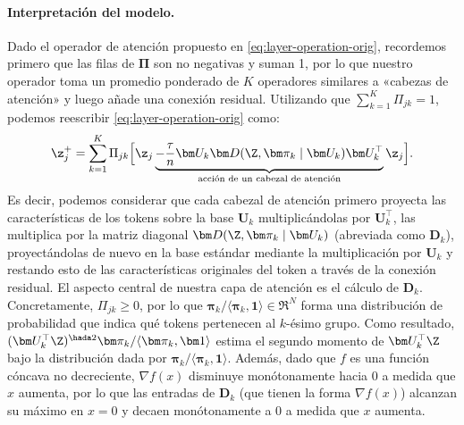 \documentclass[../../book-main.tex]{subfiles}
\begin{document}
\paragraph{Interpretación del modelo.} Dado el operador de atención
propuesto en \eqref{eq:layer-operation-orig}, recordemos primero que las
filas de $\bm\Pi$ son no negativas y suman 1, por lo que nuestro operador 
toma un promedio ponderado de $K$ operadores similares a «cabezas de atención»
y luego añade una conexión residual. Utilizando
que \(\sum_{k = 1}^{K}\Pi_{jk} = 1\), podemos reescribir
\eqref{eq:layer-operation-orig} como: %
\begin{equation}
    \label{eq:z_up}
    \z_j^+ = \sum_{k=1}^K \Pi_{jk} \Big[ \z_j \underbrace{-
            \frac{\tau}{n} \bm U_{k} \bm D(\Z, \bm \pi_{k} \mid \bm U_{k})
    \bm U_{k}^{\top}}_{\text{acción de un cabezal de atención}} \z_j \Big].
\end{equation}
Es decir, podemos considerar que cada cabezal de atención primero proyecta las características de los tokens
sobre la base $\bm U_{k}$ multiplicándolas por $\bm U_k^\top$, las multiplica por la
matriz diagonal $\bm D(\Z, \bm \pi_{k} \mid \bm U_{k})$ (abreviada como \(\bm
D_{k}\)), proyectándolas de nuevo en la base estándar mediante la multiplicación por $\bm
U_{k}$ y restando esto de las características originales del token a través de la conexión residual.
El aspecto central de nuestra capa de atención es el cálculo de $\bm
D_{k}$.  Concretamente, \(\Pi_{jk} \geq 0\), por lo que $\bm \pi_k / \langle \bm \pi_{k}, \bm
1\rangle \in \Re^N$ forma una distribución de probabilidad que indica qué tokens pertenecen al
$k$-ésimo grupo. Como resultado, $(\bm U^\top_k \Z)^{\hada 2}
\bm \pi_k / \langle \bm \pi_{k}, \bm 1\rangle$ estima el segundo
momento de $\bm U_k^\top \Z$ bajo la distribución dada por $\bm 
\pi_k /  \langle \bm \pi_{k}, \bm 1\rangle$.  Además, dado que $f$ es una
función cóncava no decreciente, $\nabla f(x)$ disminuye monótonamente
hacia $0$ a medida que $x$ aumenta, por lo que las entradas de $\bm D_{k}$
(que tienen la forma $\nabla f(x)$) alcanzan su máximo en $x=0$ %
y decaen monótonamente a $0$ a medida que $x$ aumenta.
\end{document}
